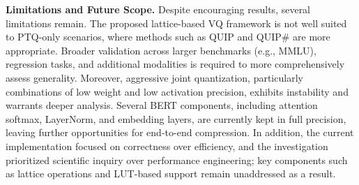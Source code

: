 \documentclass{article}
\theoremstyle{definition}
\theoremstyle{remark}
\begin{document}
\noindent \textbf{Limitations and Future Scope.} 
{Despite encouraging results, several limitations remain. The proposed lattice-based VQ framework is not well suited to PTQ-only scenarios, where methods such as QUIP and QUIP\# are more appropriate. Broader validation across larger benchmarks (e.g., MMLU), regression tasks, and additional modalities is required to more comprehensively assess generality. Moreover, aggressive joint quantization, particularly combinations of low weight and low activation precision, exhibits instability and warrants deeper analysis. Several BERT components, including attention softmax, LayerNorm, and embedding layers, are currently kept in full precision, leaving further opportunities for end-to-end compression. In addition, the current implementation focused on correctness over efficiency, and the investigation prioritized scientific inquiry over performance engineering; key components such as lattice operations and LUT-based support remain unaddressed as a result. }



\end{document}
